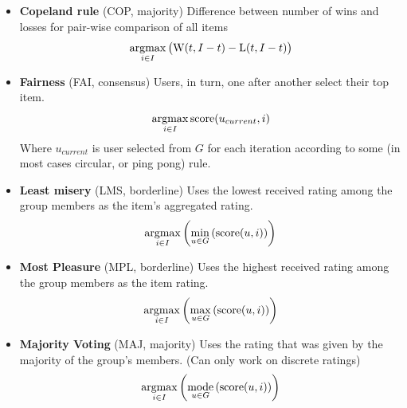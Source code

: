 \begin{itemize}
    \item \textbf{Copeland rule} (COP, majority)\newline
        Difference between number of wins and losses for pair-wise comparison of all items
        \begin{equation}
            \operatorname*{argmax}_{i \in I}{
                \big(\textrm{W}(t, I - t) - \textrm{L}(t, I - t)\big)
            }
        \end{equation}
    
    \item \textbf{Fairness} (FAI, consensus)\newline
        Users, in turn, one after another select their top item.
        \begin{equation}
            \operatorname*{argmax}_{i \in I}{{\textrm{score}(u_{current},i)}}
        \end{equation}
        Where $u_{current}$ is user selected from $G$ for each iteration according to some (in most cases circular, or ping pong) rule.
    
    \item \textbf{Least misery} (LMS, borderline)\newline
        Uses the lowest received rating among the group members as the item's aggregated rating.
        \begin{equation}
            \operatorname*{argmax}_{i \in I}{\left(\min_{u \in G}{\left(\textrm{score}(u,i)\right)}\right)}
        \end{equation}
    
    \item \textbf{Most Pleasure} (MPL, borderline)\newline
        Uses the highest received rating among the group members as the item rating.
        \begin{equation}
            \operatorname*{argmax}_{i \in I}{\left(\max_{u \in G}{\left(\textrm{score}(u,i)\right)}\right)}
        \end{equation}
        
    \item \textbf{Majority Voting} (MAJ, majority)\newline
        Uses the rating that was given by the majority of the group's members. (Can only work on discrete ratings)
        \begin{equation}
            \operatorname*{argmax}_{i \in I}{\left(\operatorname*{mode}_{u \in G}{\left(\textrm{score}(u,i)\right)}\right)}
        \end{equation}
    

\end{itemize}
